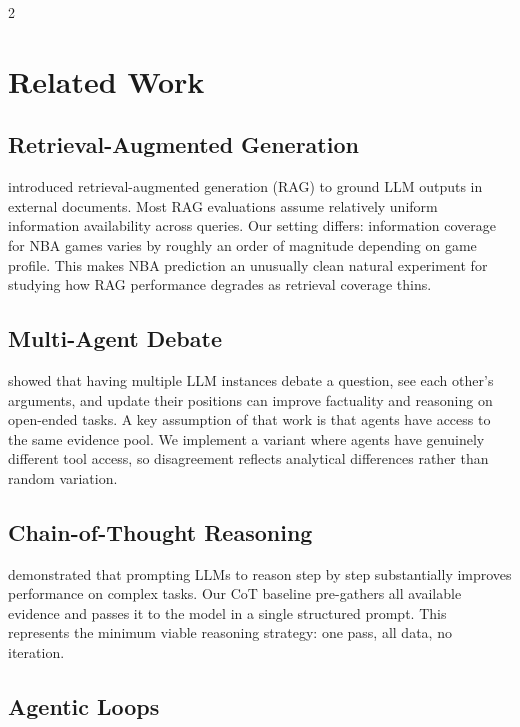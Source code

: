 \documentclass[11pt]{article}
\begin{document}
\begin{multicols}{2}
\section{Related Work}

\subsection{Retrieval-Augmented Generation}

\citet{lewis2020} introduced retrieval-augmented generation (RAG) to ground LLM outputs in external documents. Most RAG evaluations assume relatively uniform information availability across queries. Our setting differs: information coverage for NBA games varies by roughly an order of magnitude depending on game profile. This makes NBA prediction an unusually clean natural experiment for studying how RAG performance degrades as retrieval coverage thins.

\subsection{Multi-Agent Debate}

\citet{du2024} showed that having multiple LLM instances debate a question, see each other's arguments, and update their positions can improve factuality and reasoning on open-ended tasks. A key assumption of that work is that agents have access to the same evidence pool. We implement a variant where agents have genuinely different tool access, so disagreement reflects analytical differences rather than random variation.

\subsection{Chain-of-Thought Reasoning}

\citet{wei2022} demonstrated that prompting LLMs to reason step by step substantially improves performance on complex tasks. Our CoT baseline pre-gathers all available evidence and passes it to the model in a single structured prompt. This represents the minimum viable reasoning strategy: one pass, all data, no iteration.

\subsection{Agentic Loops}


\end{multicols}
\end{document}

